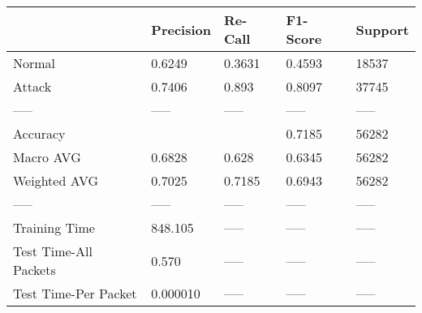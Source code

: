 \begin{tabular}{lllll}
\toprule
{} & Precision & Re-Call & F1-Score & Support \\
\midrule
Normal                &    0.6249 &  0.3631 &   0.4593 &   18537 \\
Attack                &    0.7406 &   0.893 &   0.8097 &   37745 \\
-----                 &     ----- &   ----- &    ----- &   ----- \\
Accuracy              &           &         &   0.7185 &   56282 \\
Macro AVG             &    0.6828 &   0.628 &   0.6345 &   56282 \\
Weighted AVG          &    0.7025 &  0.7185 &   0.6943 &   56282 \\
-----                 &     ----- &   ----- &    ----- &   ----- \\
Training Time         &   848.105 &   ----- &    ----- &   ----- \\
Test Time-All Packets &     0.570 &   ----- &    ----- &   ----- \\
Test Time-Per Packet  &  0.000010 &   ----- &    ----- &   ----- \\
\bottomrule
\end{tabular}
